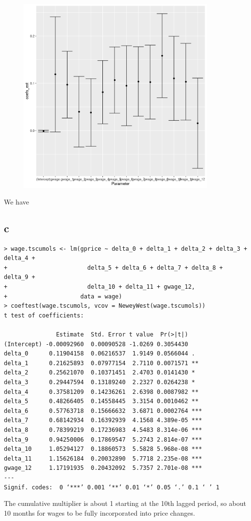 \documentclass[12pt,letterpaper]{article}
\theoremstyle{definition}
\begin{document}
\begin{figure}[H]
  \centering
  \includegraphics[width=10cm]{plot.png}
\end{figure}

We have

\subsection*{c}

\begin{Verbatim}[fontsize=\small]
> wage.tscumols <- lm(gprice ~ delta_0 + delta_1 + delta_2 + delta_3 + delta_4 +
+                       delta_5 + delta_6 + delta_7 + delta_8 + delta_9 +
+                       delta_10 + delta_11 + gwage_12,
+                     data = wage)
> coeftest(wage.tscumols, vcov = NeweyWest(wage.tscumols))
t test of coefficients:

               Estimate  Std. Error t value  Pr(>|t|)
(Intercept) -0.00092960  0.00090528 -1.0269 0.3054430
delta_0      0.11904158  0.06216537  1.9149 0.0566044 .
delta_1      0.21625893  0.07977154  2.7110 0.0071571 **
delta_2      0.25621070  0.10371451  2.4703 0.0141430 *
delta_3      0.29447594  0.13189240  2.2327 0.0264238 *
delta_4      0.37581209  0.14236261  2.6398 0.0087982 **
delta_5      0.48266405  0.14558445  3.3154 0.0010462 **
delta_6      0.57763718  0.15666632  3.6871 0.0002764 ***
delta_7      0.68142934  0.16392939  4.1568 4.389e-05 ***
delta_8      0.78399219  0.17236983  4.5483 8.314e-06 ***
delta_9      0.94250006  0.17869547  5.2743 2.814e-07 ***
delta_10     1.05294127  0.18860573  5.5828 5.968e-08 ***
delta_11     1.15626184  0.20032890  5.7718 2.235e-08 ***
gwage_12     1.17191935  0.20432092  5.7357 2.701e-08 ***
---
Signif. codes:  0 ‘***’ 0.001 ‘**’ 0.01 ‘*’ 0.05 ‘.’ 0.1 ‘ ’ 1
\end{Verbatim}

The cumulative multiplier is about 1 starting at the 10th lagged period, so about 10 months for wages to be fully incorporated into price changes.
\end{document}
